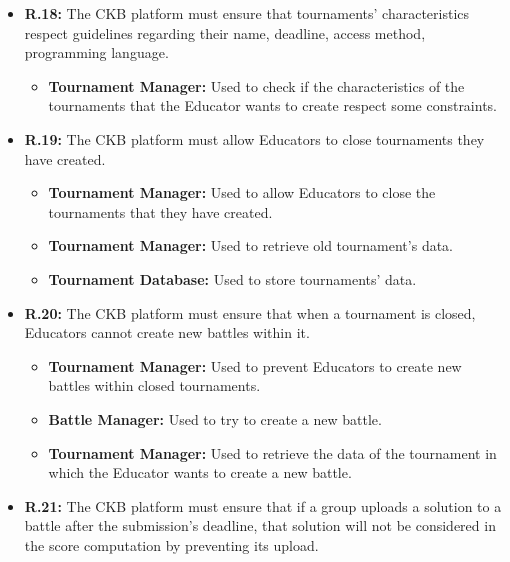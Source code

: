\documentclass{article}
\begin{document}
{\begin{itemize}
\begin{itemize}
\begin{itemize}
              \item \textbf{Tournament Database:} Used to store tournament's data.
          \end{itemize}
    \item \textbf{R.18:} The CKB platform must ensure that tournaments' characteristics respect guidelines regarding their
          name, deadline, access method, programming language.
          \begin{itemize}
              \item \textbf{Tournament Manager:} Used to check if the characteristics of the tournaments
              that the Educator wants to create respect some constraints.
          \end{itemize}
    \item \textbf{R.19:} The CKB platform must allow Educators to close tournaments they have created.
          \begin{itemize}
              \item \textbf{Tournament Manager:} Used to allow Educators to close the tournaments that they have
              created.
              \item \textbf{Tournament Manager:} Used to retrieve old tournament's data.
              \item \textbf{Tournament Database:} Used to store tournaments' data.
          \end{itemize}
    \item \textbf{R.20:} The CKB platform must ensure that when a tournament is closed, Educators cannot create new battles
          within it.
          \begin{itemize}
              \item \textbf{Tournament Manager:} Used to prevent Educators to create new battles
                within closed tournaments.
            \item \textbf{Battle Manager:} Used to try to create a new battle.
            \item \textbf{Tournament Manager:} Used to retrieve the data of the tournament in which
            the Educator wants to create a new battle. 
          \end{itemize}
    \item \textbf{R.21:} The CKB platform must ensure that if a group uploads a solution to a battle after the submission's deadline,
          that solution will not be considered in the score computation by preventing its upload.
          \begin{itemize}

\end{itemize}
\end{itemize}
\end{itemize}}
\end{document}
